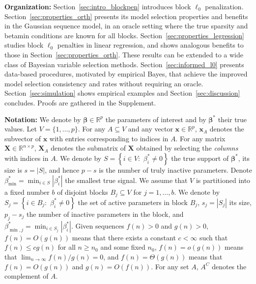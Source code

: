 \documentclass[bj,authoryear]{imsart}
\theoremstyle{plain}
\newcommand{\R}{\mathbb{R}}
\newcommand{\bs}{\boldsymbol}
\begin{document}
\noindent \textbf{Organization:} %
Section~\ref{sec:intro_blockpen} introduces block $\ell_0$ penalization. Section~\ref{sec:properties_orth} presents its
model selection properties and benefits in the Gaussian sequence model, in an oracle setting where the true sparsity and betamin conditions are known for all blocks. Section~\ref{sec:properties_legression} studies block $\ell_0$ penalties in linear regression, and shows analogous benefits to those in Section~\ref{sec:properties_orth}. These results can be extended to a wide class of Bayesian variable selection methods. Section~\ref{sec:informed_l0} presents data-based 
procedures, motivated by empirical Bayes, that achieve the improved model selection consistency and rates without requiring an oracle. Section~\ref{sec:simulation} shows empirical examples and Section~\ref{sec:discussion} concludes. Proofs are gathered in the Supplement.
\smallskip

\noindent \textbf{Notation:}  
We denote by $\bs \beta\in \R^p$ the parameters of interest 
and by $\bs \beta^*$ their true values. Let  $V=\{1,\ldots,p\}$. For any $A\subseteq V$ and any vector $\bs x\in \R^p$, $\bs x_A$ denotes the subvector of $\bs x$ with entries corresponding to indices in $A$. For any matrix $\bs X \in \R^{n\times p}$, $\bs X_A$ denotes the submatrix of $\bs X$ obtained by selecting the \emph{columns} with indices in $A$. We denote by
$S=\left\{i\in V:\,\,  \beta^*_i \neq 0 \right\}$ the true support of $\bs \beta^*$, its size is $s=|S|$, and hence $p-s$ is the number of truly inactive parameters.
Denote $\beta_{\min}^*=\min_{i \in S}|\beta^*_i|$ the smallest true signal.
We assume that $V$ is partitioned into a fixed number $b$ of disjoint blocks $B_j \subseteq V$ for $j=1,\ldots,b$.
We denote by $S_j=\left\{i\in B_j:\,\,  \beta^*_i \neq 0\right\}$ the set of active parameters in block $B_j$,  $s_j=|S_j|$ its size, $p_j-s_j$ the number of inactive parameters in the block,
and $\beta_{\min,j}^*=\min_{i \in S_j}|\beta^*_i|$.
Given sequences $f(n) > 0$ and $g(n) >0$, $f(n)=O(g(n))$ means that there exists a constant $c<\infty$ such that $f(n) \leq c g(n)$ for all $n \geq n_0$ and some fixed $n_0$, $f(n)=o(g(n))$ means that $\lim_{n\to\infty}f(n)/g(n)=0$, and $f(n)=\Theta(g(n))$ means that $f(n) = O(g(n))$ and $g(n) = O(f(n))$. For any set $A$, $A^C$ denotes the complement of $A$. \smallskip
\end{document}
